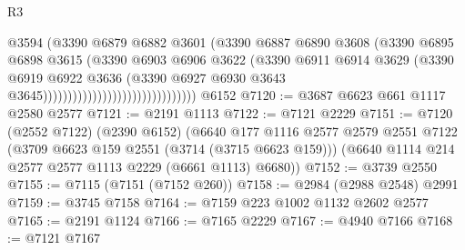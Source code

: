 \begin{lexlean}{R3}
\begin{coremodule}
                                                    @3594
                                                    (@3390
                                                      @6879
                                                      @6882
                                                      @3601
                                                      (@3390
                                                        @6887
                                                        @6890
                                                        @3608
                                                        (@3390
                                                          @6895
                                                          @6898
                                                          @3615
                                                          (@3390
                                                            @6903
                                                            @6906
                                                            @3622
                                                            (@3390
                                                              @6911
                                                              @6914
                                                              @3629
                                                              (@3390
                                                                @6919
                                                                @6922
                                                                @3636
                                                                (@3390
                                                                  @6927
                                                                  @6930
                                                                  @3643
                                                                  @3645)))))))))))))))))))))))))))))))
    @6152
@7120 := @3687 @6623 @661 @1117 @2580 @2577
@7121 := @2191 @1113
@7122 := @7121 @2229
@7151 := @7120
    (@2552 @7122)
    (@2390 @6152)
    (@6640
      @177
      @1116
      @2577
      @2579
      @2551
      @7122
      (@3709 @6623 @159 @2551 (@3714 (@3715 @6623 @159)))
      (@6640 @1114 @214 @2577 @2577 @1113 @2229 (@6661 @1113) @6680))
@7152 := @3739 @2550
@7155 := @7115 (@7151 (@7152 @260))
@7158 := @2984 (@2988 @2548) @2991
@7159 := @3745 @7158
@7164 := @7159 @223 @1002 @1132 @2602 @2577
@7165 := @2191 @1124
@7166 := @7165 @2229
@7167 := @4940 @7166
@7168 := @7121 @7167

\end{coremodule}
\end{lexlean}
